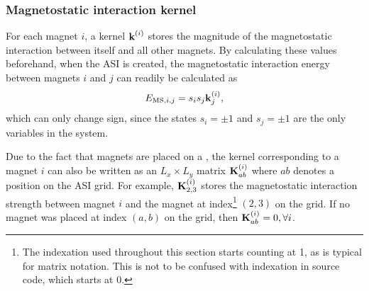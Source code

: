 \subsubsection{Magnetostatic interaction kernel}\label{sec:2:Kernels:Structure}
For each magnet $i$, a kernel $\boldsymbol{\mathbf{k}}^{(i)}$ stores the magnitude of the magnetostatic interaction between itself and all other magnets.
By calculating these values beforehand, when the ASI is created, the magnetostatic interaction energy between magnets $i$ and $j$ can readily be calculated as
\begin{equation}
	\label{eq:2:Kernel_k}
	E_{\mathrm{MS},i,j}= s_i s_j \boldsymbol{\mathbf{k}}^{(i)}_j \mathrm{,}
\end{equation}
which can only change sign, since the states $s_i = \pm 1$ and $s_j = \pm 1$ are the only variables in the system. \par
Due to the fact that magnets are placed on a , the kernel corresponding to a magnet $i$ can also be written as an $L_x \times L_y$ matrix $\boldsymbol{\mathbf{K}}^{(i)}_{ab}$ where $ab$ denotes a position on the ASI grid.
For example, $\boldsymbol{\mathbf{K}}^{(i)}_{2,3}$ stores the magnetostatic interaction strength between magnet $i$ and the magnet at index\footnote{
	The indexation used throughout this section starts counting at 1, as is typical for matrix notation.
	This is not to be confused with indexation in source code, which starts at 0.
} $(2,3)$ on the grid.
If no magnet was placed at index $(a,b)$ on the grid, then $\boldsymbol{\mathbf{K}}^{(i)}_{ab} = 0, \forall i$. \\\par


